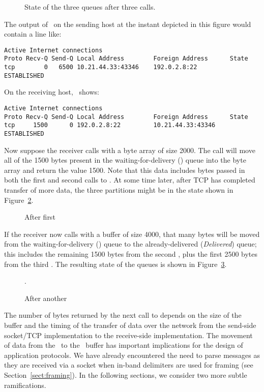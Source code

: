 \begin{figure}
\caption{\label{fig:buffers0}State of  the three queues after three
   calls.}
\end{figure}

The output of \netstat\ on the sending host at the instant depicted in
this figure would contain a line like:
\begin{verbatim}
Active Internet connections
Proto Recv-Q Send-Q Local Address        Foreign Address      State
tcp        0   6500 10.21.44.33:43346    192.0.2.8:22         ESTABLISHED
\end{verbatim}
On the receiving host, \netstat\ shows:
\begin{verbatim}
Active Internet connections
Proto Recv-Q Send-Q Local Address        Foreign Address      State
tcp     1500      0 192.0.2.8:22         10.21.44.33:43346    ESTABLISHED
\end{verbatim}

Now suppose the receiver calls  with
a byte array of size 2000.  The  call
will move all of the 1500 bytes present in the waiting-for-delivery
(\rque) queue into the byte array and return the value 1500.
Note that this data includes bytes passed in both the first and second
calls to .  At some time later,
after TCP has completed transfer of more data, the three partitions
might be in the state shown in Figure~\ref{fig:buffers1}.

\begin{figure}
\caption{\label{fig:buffers1}After first }
\end{figure}

If the receiver now calls  with a
buffer of size 4000, that many bytes will be moved from the
waiting-for-delivery (\rque) queue to the already-delivered
(\emph{Delivered}) queue; this includes the remaining 1500 bytes from
the second , plus the first 2500
bytes from the third .  The
resulting state of the queues is shown in Figure~\ref{fig:buffers2}.

\begin{figure}
\caption{\label{fig:buffers2}After another }.
\end{figure}

The number of bytes returned by the next call to
 depends on the size of the buffer
and the timing of the transfer of data over the network from the
send-side socket/TCP implementation to the receive-side
implementation.  The movement of data from the \sque\ to the
\rque\ buffer has important implications for the design of
application protocols. We have already encountered the need to parse
messages as they are received via a socket
when in-band delimiters are used for framing (see
Section~\ref{sect:framing}).  In the following 
sections, we consider two more subtle ramifications.

